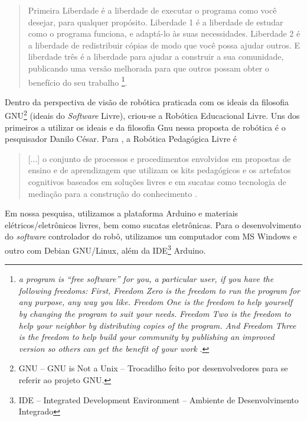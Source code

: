 \documentclass{textolivre}
\begin{document}
\begin{quote}
Primeira Liberdade é a liberdade de executar o programa como você desejar, para qualquer propósito. \newline
Liberdade 1 é a liberdade de estudar como o programa funciona, e adaptá-lo às suas necessidades. \newline 
Liberdade 2 é a liberdade de redistribuir cópias de modo que você possa ajudar outros. \newline 
E liberdade três é a liberdade para ajudar a construir a sua comunidade, publicando uma versão melhorada para que outros possam obter o benefício do seu trabalho \cite[p. 165, tradução dos autores]{stallman2002}\footnote{\emph{a program is “free software” for you, a particular user, if you have the following freedoms: \newline
First, Freedom Zero is the freedom to run the program for any purpose, any way you like. \newline
Freedom One is the freedom to help yourself by changing the program to suit your needs. \newline
Freedom Two is the freedom to help your neighbor by distributing copies of the program. \newline
And Freedom Three is the freedom to help build your community by publishing an improved version so others can get the
benefit of your work} \cite[p. 165]{stallman2002}.}.
\end{quote}

Dentro da perspectiva de visão de robótica praticada com os ideais da filosofia GNU\footnote{GNU – GNU is Not a Unix – Trocadilho feito por desenvolvedores para se referir ao projeto GNU.} (ideais do \emph{Software} Livre), criou-se a Robótica Educacional Livre. Uns dos primeiros a utilizar os ideais e da filosofia Gnu nessa proposta de robótica é o pesquisador Danilo César. Para \textcite{cesar2013}, a Robótica Pedagógica Livre é

\begin{quote}
[...] o conjunto de processos e procedimentos envolvidos em propostas de ensino e de aprendizagem que utilizam os kits pedagógicos e os artefatos cognitivos baseados em soluções livres e em sucatas como tecnologia de mediação para a construção do conhecimento \cite{cesar2013}.
\end{quote}

Em nossa pesquisa, utilizamos a plataforma Arduino e materiais elétricos/eletrônicos livres, bem como sucatas eletrônicas. Para o desenvolvimento do \emph{software} controlador do robô, utilizamos  um computador com MS Windows e outro com Debian GNU/Linux, além da IDE\footnote{IDE – Integrated Development Environment – Ambiente de Desenvolvimento Integrado} Arduino.
\end{document}
